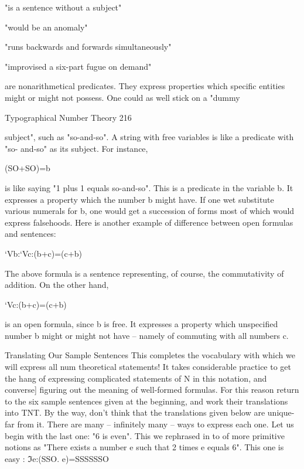                              "is a sentence without a subject"

                                  "would be an anomaly"

                      "runs backwards and forwards simultaneously"

                         "improvised a six-part fugue on demand"

are nonarithmetical predicates. They express properties which specific entities might or
might not possess. One could as well stick on a "dummy




Typographical Number Theory                                                              216

subject", such as "so-and-so". A string with free variables is like a predicate with "so-
and-so" as its subject. For instance,

                                       (SO+SO)=b

is like saying "1 plus 1 equals so-and-so". This is a predicate in the variable b. It
expresses a property which the number b might have. If one wet substitute various
numerals for b, one would get a succession of forms most of which would express
falsehoods. Here is another example of difference between open formulas and sentences:

                                  `Vb:`Vc:(b+c)=(c+b)

The above formula is a sentence representing, of course, the commutativity of addition.
On the other hand,

                                     `Vc:(b+c)=(c+b)

is an open formula, since b is free. It expresses a property which unspecified number b
might or might not have -- namely of commuting with all numbers c.

                       Translating Our Sample Sentences
This completes the vocabulary with which we will express all num theoretical statements!
It takes considerable practice to get the hang of expressing complicated statements of N
in this notation, and converse] figuring out the meaning of well-formed formulas. For this
reason return to the six sample sentences given at the beginning, and work their
translations into TNT. By the way, don't think that the translations given below are
unique-far from it. There are many -- infinitely many -- ways to express each one.
         Let us begin with the last one: "6 is even". This we rephrased in to of more
primitive notions as "There exists a number e such that 2 times e equals 6". This one is
easy
       :
                                 ℑe:(SSO. e)=SSSSSSO

